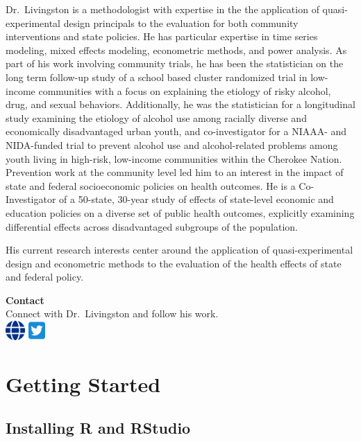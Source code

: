 \documentclass[
  letterpaper,
  DIV=11,
  numbers=noendperiod]{scrreprt}
\begin{document}
Dr.~Livingston is a methodologist with expertise in the the application
of quasi-experimental design principals to the evaluation for both
community interventions and state policies. He has particular expertise
in time series modeling, mixed effects modeling, econometric methods,
and power analysis. As part of his work involving community trials, he
has been the statistician on the long term follow-up study of a school
based cluster randomized trial in low-income communities with a focus on
explaining the etiology of risky alcohol, drug, and sexual behaviors.
Additionally, he was the statistician for a longitudinal study examining
the etiology of alcohol use among racially diverse and economically
disadvantaged urban youth, and co-investigator for a NIAAA- and
NIDA-funded trial to prevent alcohol use and alcohol-related problems
among youth living in high-risk, low-income communities within the
Cherokee Nation. Prevention work at the community level led him to an
interest in the impact of state and federal socioeconomic policies on
health outcomes. He is a Co-Investigator of a 50-state, 30-year study of
effects of state-level economic and education policies on a diverse set
of public health outcomes, explicitly examining differential effects
across disadvantaged subgroups of the population.

His current research interests center around the application of
quasi-experimental design and econometric methods to the evaluation of
the health effects of state and federal policy.

\textbf{Contact}\\
Connect with Dr.~Livingston and follow his work.\\
\includegraphics[width=2em,height=2em]{chapters/about_the_authors/about_the_authors_files/figure-pdf/fa-icon-a4a233699ebb8edeaca4e7ae0455099b.pdf}
\includegraphics[width=1.75em,height=2em]{chapters/about_the_authors/about_the_authors_files/figure-pdf/fa-icon-ab37b36564b32e84e458655a90d49135.pdf}

\part{Getting Started}

\chapter{Installing R and RStudio}\label{installing-r-and-rstudio}
\end{document}
